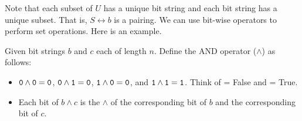 Note that each subset of $U$ has a unique bit string and each bit string has a unique subset.  That is, $S \leftrightarrow b$ is a pairing. We can use bit-wise operators to perform set operations.  Here is an example.

\begin{exam}
\label{exam_bs_rep_AND}
    Given bit strings $b$ and $c$ each of length $n$.  Define the AND operator ($\land$) as follows:
        \begin{itemize}
            \item $\texttt{0} \land \texttt{0} = \texttt{0}$, $\texttt{0} \land \texttt{1} = \texttt{0}$, $\texttt{1} \land \texttt{0} = \texttt{0}$, and $\texttt{1} \land \texttt{1} = \texttt{1}$.  Think of  = False and  = True.
            \item Each bit of $b \land c$ is the $\land$ of the corresponding bit of $b$ and the corresponding bit of $c$.
        \end{itemize}


\end{exam}
